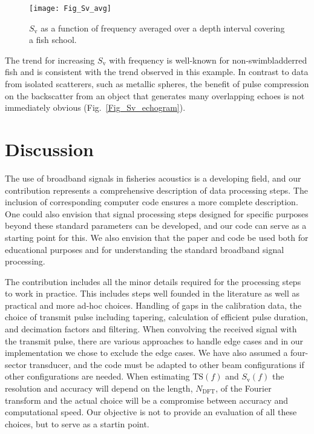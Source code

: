 \documentclass[preprint,12pt,TurnOnLineNumbers]{JASAnew}
\newcommand{\freqsym}{f}
\newcommand{\ts}{\textrm{TS}}
\newcommand{\sv}{S_{\textrm{v}}}
\newcommand{\ndft}{{N_{\textrm{DFT}}}}
\begin{document}
\begin{figure}
\texttt{[image: Fig\_Sv\_avg]}
\caption{\label{Fig_Sv_avg} $\sv$ as a function of frequency averaged over a depth interval covering a fish school.}
\end{figure}

The trend for increasing $\sv$ with frequency is well-known for non-swimbladderred fish \citep{korneliussen2010} and is consistent with the trend observed in this example. In contrast to data from isolated scatterers, such as metallic spheres, the benefit of pulse compression on the backscatter from an object that generates many overlapping echoes is not immediately obvious (Fig.~\ref{Fig_Sv_echogram}).

\section{Discussion}

The use of broadband signals in fisheries acoustics is a developing field, and our contribution represents a comprehensive description of data processing steps. The inclusion of corresponding computer code ensures a more complete description. One could also envision that signal processing steps designed for specific purposes beyond these standard parameters can be developed, and our code can serve as a starting point for this. We also envision that the paper and code be used both for educational purposes and for understanding the standard broadband signal processing.

The contribution includes all the minor details required for the processing steps to work in practice. This includes steps well founded in the literature as well as practical and more ad-hoc choices. Handling of gaps in the calibration data, the choice of transmit pulse including tapering, calculation of efficient pulse duration, and decimation factors and filtering. When convolving the received signal with the transmit pulse, there are various approaches to handle edge cases and in our implementation we chose to exclude the edge cases. We have also assumed a four-sector transducer, and the code must be adapted to other beam configurations if other configurations are needed. When estimating $\ts(\freqsym)$ and $\sv(\freqsym)$ the resolution and accuracy will depend on the length, $\ndft$, of the Fourier transform and the actual choice will be a compromise between accuracy and computational speed. Our objective is not to provide an evaluation of all these choices, but to serve as a startin point.
\end{document}
